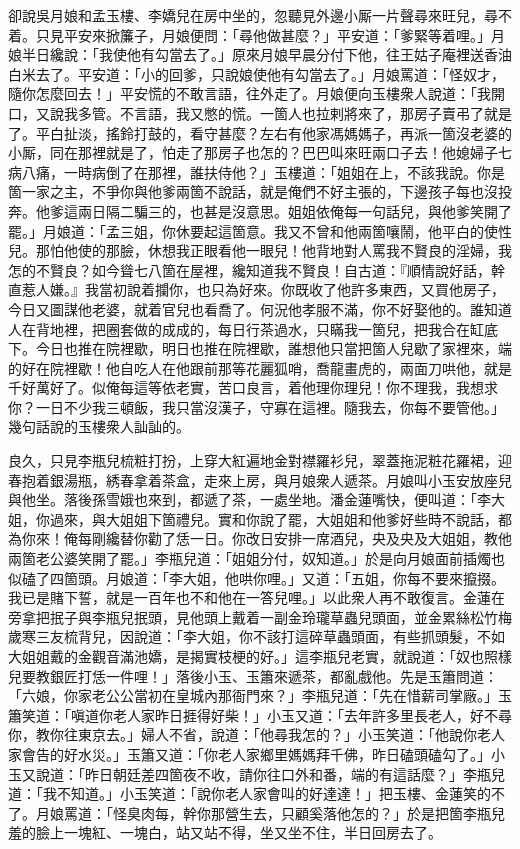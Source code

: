 卻說吳月娘和孟玉樓、李嬌兒在房中坐的，忽聽見外邊小厮一片聲尋來旺兒，尋不着。只見平安來掀簾子，月娘便問：「尋他做甚麼？」平安道：「爹緊等着哩。」月娘半日纔說：「我使他有勾當去了。」原來月娘早晨分付下他，往王姑子庵裡送香油白米去了。平安道：「小的回爹，只說娘使他有勾當去了。」月娘罵道：「怪奴才，隨你怎麼回去！」平安慌的不敢言語，往外走了。{}月娘便向玉樓衆人說道：「我開口，又說我多管。不言語，我又憋的慌。一箇人也拉剌將來了，那房子賣弔了就是了。平白扯淡，搖鈴打鼓的，看守甚麼？左右有他家馮媽媽子，再派一箇沒老婆的小厮，同在那裡就是了，怕走了那房子也怎的？巴巴叫來旺兩口子去！他媳婦子七病八痛，{}一時病倒了在那裡，誰扶侍他？」玉樓道：「姐姐在上，不該我說。你是箇一家之主，不爭你與他爹兩箇不說話，就是俺們不好主張的，下邊孩子每也沒投奔。他爹這兩日隔二騙三的，也甚是沒意思。姐姐依俺每一句話兒，與他爹笑開了罷。」月娘道：「孟三姐，你休要起這箇意。我又不曾和他兩箇嚷鬧，他平白的使性兒。那怕他使的那臉，休想我正眼看他一眼兒！他背地對人罵我不賢良的淫婦，我怎的不賢良？如今聳七八箇在屋裡，纔知道我不賢良！自古道：『順情說好話，幹直惹人嫌。』我當初說着攔你，也只為好來。你既收了他許多東西，又買他房子，今日又圖謀他老婆，就着官兒也看喬了。何況他孝服不滿，你不好娶他的。誰知道人在背地裡，把圈套做的成成的，每日行茶過水，只瞞我一箇兒，把我合在缸底下。今日也推在院裡歇，明日也推在院裡歇，誰想他只當把箇人兒歇了家裡來，端的好在院裡歇！他自吃人在他跟前那等花麗狐哨，喬龍畫虎的，{}兩面刀哄他，就是千好萬好了。似俺每這等依老實，苦口良言，着他理你理兒！你不理我，我想求你？一日不少我三頓飯，我只當沒漢子，守寡在這裡。{}隨我去，你每不要管他。」幾句話說的玉樓衆人訕訕的。

良久，只見李瓶兒梳粧打扮，上穿大紅遍地金對襟羅衫兒，翠蓋拖泥粧花羅裙，迎春抱着銀湯瓶，綉春拿着茶盒，走來上房，與月娘衆人遞茶。月娘叫小玉安放座兒與他坐。落後孫雪娥也來到，都遞了茶，一處坐地。潘金蓮嘴快，便叫道：「李大姐，你過來，與大姐姐下箇禮兒。實和你說了罷，大姐姐和他爹好些時不說話，都為你來！俺每剛纔替你勸了恁一日。你改日安排一席酒兒，央及央及大姐姐，教他兩箇老公婆笑開了罷。」李瓶兒道：「姐姐分付，奴知道。」於是向月娘面前插燭也似磕了四箇頭。月娘道：「李大姐，他哄你哩。」又道：「五姐，你每不要來攛掇。我已是賭下誓，就是一百年也不和他在一答兒哩。」以此衆人再不敢復言。金蓮在旁拿把抿子與李瓶兒抿頭，見他頭上戴着一副金玲瓏草蟲兒頭面，並金累絲松竹梅歲寒三友梳背兒，因說道：「李大姐，你不該打這碎草蟲頭面，有些抓頭髮，不如大姐姐戴的金觀音滿池嬌，是揭實枝梗的好。」{}這李瓶兒老實，就說道：「奴也照樣兒要教銀匠打恁一件哩！」落後小玉、玉簫來遞茶，都亂戲他。先是玉簫問道：「六娘，你家老公公當初在皇城內那衙門來？」李瓶兒道：「先在惜薪司掌廠。」玉簫笑道：「嗔道你老人家昨日捱得好柴！」小玉又道：「去年許多里長老人，好不尋你，教你往東京去。」婦人不省，說道：「他尋我怎的？」小玉笑道：「他說你老人家會告的好水災。」玉簫又道：「你老人家鄉里媽媽拜千佛，昨日磕頭磕勾了。」小玉又說道：「昨日朝廷差四箇夜不收，請你往口外和番，端的有這話麼？」李瓶兒道：「我不知道。」小玉笑道：「說你老人家會叫的好達達！」把玉樓、金蓮笑的不了。月娘罵道：「怪臭肉每，幹你那營生去，只顧奚落他怎的？」於是把箇李瓶兒羞的臉上一塊紅、一塊白，站又站不得，坐又坐不住，{}半日回房去了。

